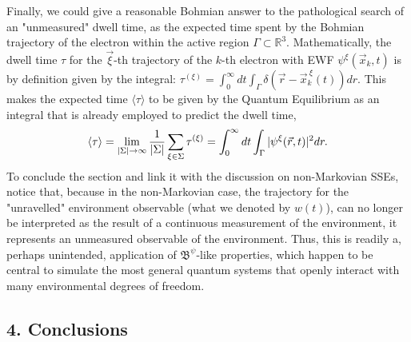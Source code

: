\documentclass[11pt, a4paper]{article} %
\newcommand{\R}{\mathbb{R}} %
\newcommand{\B}{\mathfrak{B}}
\begin{document}
Finally, we could give a reasonable Bohmian answer to the pathological search of an "unmeasured" dwell time, as the expected time spent by the Bohmian trajectory of the electron within the active region $\Gamma\subset \R^3$. Mathematically, the dwell time $\tau$ for the $\vec{\xi}$-th trajectory of the $k$-th electron with EWF $\psi^\xi(\vec{x}_k,t)$ is by definition given by the integral: $\tau^{( \xi)}= \int_{0}^\infty  dt \int_\Gamma \delta(\vec{r}-\vec{x}_k^{\:\xi}(t)) dr$. This makes the expected time $\langle \tau\rangle$ to be given by the Quantum Equilibrium as an integral that is already employed to predict the dwell time,\vspace{-0.15cm}
\begin{equation}
\langle \tau \rangle = \lim_{|\Sigma|\rightarrow \infty}\frac{1}{|\Sigma|} \sum_{\xi\in\Sigma} \tau^{(\xi)} = \int_{0}^\infty dt \int_\Gamma |\psi^\xi(\vec{r},t)|^2dr.\vspace{-0.2cm}
\end{equation}
To conclude the section and link it with the discussion on non-Markovian SSEs, notice that, because in the non-Markovian case, the trajectory for the "unravelled" environment observable (what we denoted by $w(t)$), can no longer be interpreted as the result of a continuous measurement of the environment, it represents an unmeasured observable of the environment. Thus, this is readily a, perhaps unintended, application of $\B^\psi$-like properties, which happen to be central to simulate the most general quantum systems that openly interact with many environmental degrees of freedom. \vspace{-0.2cm}

\subsection*{4. Conclusions}\vspace{-0.15cm}
\end{document}
